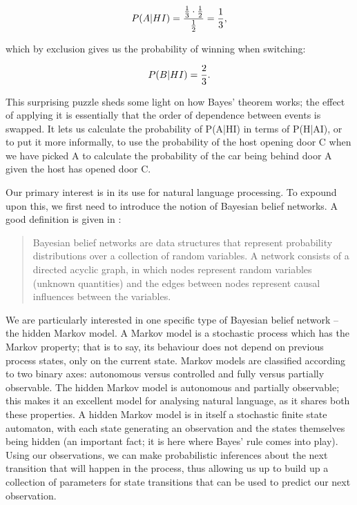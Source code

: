 \begin{equation}
  \\P(A|HI) = \frac{\frac{1}{3} \cdot \frac{1}{2}}{\frac{1}{2}} = \frac{1}{3},
\end{equation}

which by exclusion gives us the probability of winning when switching:

\begin{equation}
  \\P(B|HI) = \frac{2}{3}.
\end{equation}

This surprising puzzle sheds some light on how Bayes' theorem works; the effect
of applying it is essentially that the order of dependence between events is
swapped. It lets us calculate the probability of P(A|HI) in terms of P(H|AI),
or to put it more informally, to use the probability of the host opening door C
when we have picked A to calculate the probability of the car being behind door
A given the host has opened door C.

Our primary interest is in its use for natural language processing. To
expound upon this, we first need to introduce the notion of Bayesian belief
networks. A good definition is given in \citet[80]{bod2004}:

\begin{quote}
Bayesian belief networks are data structures that represent probability
distributions over a collection of random variables. A network consists of a
directed acyclic graph, in which nodes represent random variables (unknown
quantities) and the edges between nodes represent causal influences between the
variables.
\end{quote}

We are particularly interested in one specific type of Bayesian belief network
-- the hidden Markov model. A Markov model is a stochastic process which has
the Markov property; that is to say, its behaviour does not depend on previous
process states, only on the current state. Markov models are classified
according to two binary axes: autonomous versus controlled and fully versus
partially observable. The hidden Markov model is autonomous and partially
observable; this makes it an excellent model for analysing natural language, as
it shares both these properties. A hidden Markov model is in itself a
stochastic finite state automaton, with each state generating an observation
and the states themselves being hidden (an important fact; it is here where
Bayes' rule comes into play). Using our observations, we can make probabilistic
inferences about the next transition that will happen in the process, thus
allowing us up to build up a collection of parameters for state transitions
that can be used to predict our next observation.

